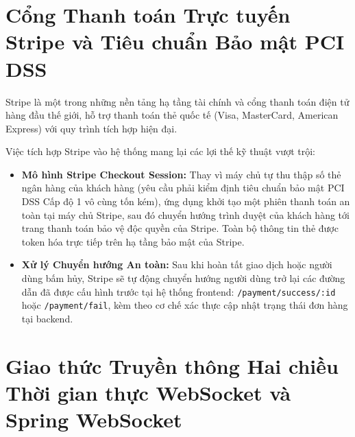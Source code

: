 \documentclass{uetgraduation}
\begin{document}
\section{Cổng Thanh toán Trực tuyến Stripe và Tiêu chuẩn Bảo mật PCI DSS}
Stripe là một trong những nền tảng hạ tầng tài chính và cổng thanh toán điện tử hàng đầu thế giới, hỗ trợ thanh toán thẻ quốc tế (Visa, MasterCard, American Express) với quy trình tích hợp hiện đại.

Việc tích hợp Stripe vào hệ thống mang lại các lợi thế kỹ thuật vượt trội:
\begin{itemize}
    \item \textbf{Mô hình Stripe Checkout Session:} Thay vì máy chủ tự thu thập số thẻ ngân hàng của khách hàng (yêu cầu phải kiểm định tiêu chuẩn bảo mật PCI DSS Cấp độ 1 vô cùng tốn kém), ứng dụng khởi tạo một phiên thanh toán an toàn tại máy chủ Stripe, sau đó chuyển hướng trình duyệt của khách hàng tới trang thanh toán bảo vệ độc quyền của Stripe. Toàn bộ thông tin thẻ được token hóa trực tiếp trên hạ tầng bảo mật của Stripe.
    \item \textbf{Xử lý Chuyển hướng An toàn:} Sau khi hoàn tất giao dịch hoặc người dùng bấm hủy, Stripe sẽ tự động chuyển hướng người dùng trở lại các đường dẫn đã được cấu hình trước tại hệ thống frontend: \texttt{/payment/success/:id} hoặc \texttt{/payment/fail}, kèm theo cơ chế xác thực cập nhật trạng thái đơn hàng tại backend.
\end{itemize}

\section{Giao thức Truyền thông Hai chiều Thời gian thực WebSocket và Spring WebSocket}
\end{document}

